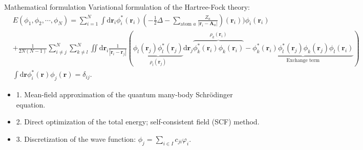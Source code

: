 \documentclass[aspectratio=169]{beamer}
\begin{document}

\begin{frame}{Mathematical formulation}
	Variational formulation of the Hartree-Fock theory:
	\begin{equation*}
		\begin{aligned}
			& E(\phi_1, \phi_2, \cdots, \phi_N) = 
	\sum_{i=1}^N \int\text{d}\mathbf{r}_i
		  \phi_i^*(\mathbf{r}_i) (-\frac{1}{2}\Delta - \sum_{\text{atom } a}
			\frac{Z_a}{|\mathbf{r}_i - \mathbf{A}_a|})(\mathbf{r}_i))
			 \phi_i(\mathbf{r}_i) \\ 
			&+ \frac{1}{2N(N - 1)} \sum_{i \neq j}^N \sum_{k \neq l}^N \iint
			\mathrm{d}\mathbf{r}_i
			\frac{1}{|\mathbf{r}_i-\mathbf{r}_j|}
			\left(\underbrace{\phi_l(\mathbf{r}_j)\phi_l^*(\mathbf{r}_j)}_{\rho_l(\mathbf{r}_j)}
			\text{d}\mathbf{r}_j \overbrace{\phi_k^*(\mathbf{r}_i)\phi_k(\mathbf{r}_i)
			}^{\rho_k(\mathbf{r}_i)} - \underbrace{\phi_k^*(\mathbf{r}_i)\phi_l^*(\mathbf{r}_j)
			\phi_k(\mathbf{r}_j)\phi_l(\mathbf{r}_i)}_{\text{Exchange term}}\right)  \\
      & \int\text{d}\mathbf{r}
		  \phi_i^*(\mathbf{r}) \phi_j(\mathbf{r}) = \delta_{ij}.
		\end{aligned}
	\end{equation*}
	\begin{itemize}
		\item 1. Mean-field approximation of the quantum many-body Schr\"odinger equation.
		\item 2. Direct optimization of the total energy; self-consistent field (SCF) method.
		\item 3. Discretization of the wave function: $\phi_j = \sum_{i\in I} c_{ji}\varphi_i$.
	\end{itemize}
\end{frame}
\end{document}
